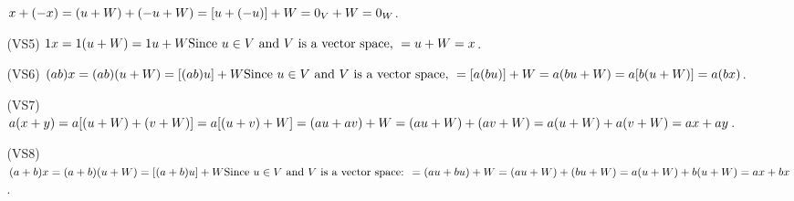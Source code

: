 \documentclass{article}
\begin{document}
\begin{enumerate}
\begin{itemize}[leftmargin=4em]
                        $x+(-x)\\
                              =(u+W)+(-u+W)\\
                              =[u+(-u)]+W\\
                              =0_V+W\\
                              =0_W$.
                  \item [(VS5)]
                        $1x\\
                              =1(u+W)\\
                              =1u+W\\
                              \text{Since } u \in V \text{ and } V \text{ is a vector space, }\\
                              =u+W\\
                              =x$.
                  \item [(VS6)]
                        $(ab)x\\
                              =(ab)(u+W)\\
                              =[(ab)u]+W\\
                              \text{Since } u \in V \text{ and } V \text{ is a vector space, }\\
                              =[a(bu)]+W\\
                              =a(bu+W)\\
                              =a[b(u+W)]\\
                              =a(bx)$.
                  \item [(VS7)]
                        $a(x+y)\\
                              =a[(u+W)+(v+W)]\\
                              =a[(u+v)+W]\\
                              =(au+av)+W\\
                              =(au+W)+(av+W)\\
                              =a(u+W)+a(v+W)\\
                              =ax+ay$.
                  \item [(VS8)]
                        $(a+b)x\\
                              =(a+b)(u+W)\\
                              =[(a+b)u]+W\\
                              \text{Since } u \in V \text{ and } V \text{ is a vector space: }\\
                              =(au+bu)+W\\
                              =(au+W)+(bu+W)\\
                              =a(u+W)+b(u+W)\\
                              =ax+bx$.
            \end{itemize}


\end{enumerate}
\end{document}
